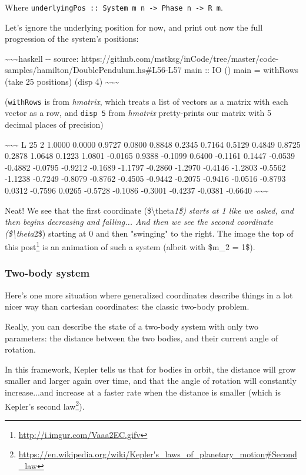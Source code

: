 \documentclass[]{article}
\renewcommand{\href}[2]{#2\footnote{\url{#1}}}
\begin{document}
Where
\texttt{underlyingPos\ ::\ System\ m\ n\ -\textgreater{}\ Phase\ n\ -\textgreater{}\ R\ m}.

Let's ignore the underlying position for now, and print out now the full
progression of the system's positions:

\textasciitilde{}\textasciitilde{}\textasciitilde{}haskell -\/- source:
https://github.com/mstksg/inCode/tree/master/code-samples/hamilton/DoublePendulum.hs\#L56-L57
main :: IO () main = withRows (take 25 positions) (disp 4)
\textasciitilde{}\textasciitilde{}\textasciitilde{}

(\texttt{withRows} is from \emph{hmatrix}, which treats a list of vectors as a
matrix with each vector as a row, and \texttt{disp\ 5} from \emph{hmatrix}
pretty-prints our matrix with 5 decimal places of precision)

\textasciitilde{}\textasciitilde{}\textasciitilde{} L 25 2 1.0000 0.0000 0.9727
0.0800 0.8848 0.2345 0.7164 0.5129 0.4849 0.8725 0.2878 1.0648 0.1223 1.0801
-0.0165 0.9388 -0.1099 0.6400 -0.1161 0.1447 -0.0539 -0.4882 -0.0795 -0.9212
-0.1689 -1.1797 -0.2860 -1.2970 -0.4146 -1.2803 -0.5562 -1.1238 -0.7249 -0.8079
-0.8762 -0.4505 -0.9442 -0.2075 -0.9416 -0.0516 -0.8793 0.0312 -0.7596 0.0265
-0.5728 -0.1086 -0.3001 -0.4237 -0.0381 -0.6640
\textasciitilde{}\textasciitilde{}\textasciitilde{}

Neat! We see that the first coordinate (\$\textbackslash{}theta\emph{1\$) starts
at 1 like we asked, and then begins decreasing and falling... And then we see
the second coordinate (\$\textbackslash{}theta}2\$) starting at 0 and then
"swinging" to the right. The \href{http://i.imgur.com/Vaaa2EC.gifv}{image the
top of this post} is an animation of such a system (albeit with \$m\_2 = 1\$).

\subsubsection{Two-body system}

Here's one more situation where generalized coordinates describe things in a lot
nicer way than cartesian coordinates: the classic two-body problem.

Really, you can describe the state of a two-body system with only two
parameters: the distance between the two bodies, and their current angle of
rotation.

In this framework, Kepler tells us that for bodies in orbit, the distance will
grow smaller and larger again over time, and that the angle of rotation will
constantly increase...and increase at a faster rate when the distance is smaller
(which is
\href{https://en.wikipedia.org/wiki/Kepler's_laws_of_planetary_motion\#Second_law}{Kepler's
second law}).
\end{document}
